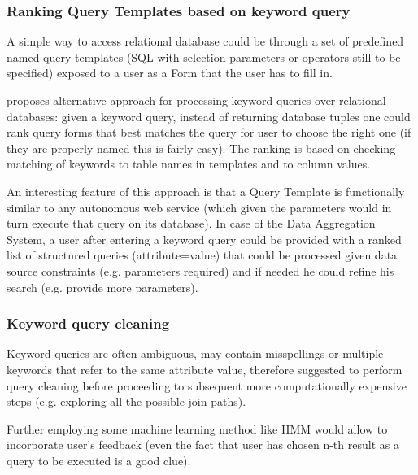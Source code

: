 % 

\subsubsection*{Ranking Query Templates based on keyword query}
A simple way to access relational database could  be through a set of predefined named query templates (SQL with selection parameters or operators still to be specified) exposed to a user as a Form that the user has to fill in.

\cite{forms_kws} proposes alternative approach for processing keyword queries over relational databases: given a keyword query, instead of returning database tuples one could rank query forms that best matches the query for user to choose the right one (if they are properly named this is fairly easy). The ranking is based on checking matching of keywords to table names in templates and to column values.

An interesting feature of this approach is that a Query Template is functionally similar to any autonomous web service (which given the parameters would in turn execute that query on its database).  In case of the Data Aggregation System, a user after entering a keyword query could be provided with a ranked list of structured queries (attribute=value) that could be processed given data source constraints (e.g. parameters required) and if needed he could refine his search (e.g. provide more parameters).


\subsubsection*{Keyword query cleaning}
Keyword queries are often ambiguous, may contain misspellings or multiple keywords that refer to the same attribute value,  therefore \cite{kw_cleaning} suggested to perform query cleaning before proceeding to subsequent more computationally expensive steps (e.g. exploring all the possible join paths).

Further employing some machine learning method like HMM\cite{kw_cleaning_hmm} would allow to incorporate user's feedback (even the fact that user has chosen n-th result as a query to be executed is a good clue).


